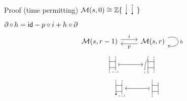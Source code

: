 
\begin{frame}[fragile]{Proof (time permitting)}
	\pause
	 $\cM(s,0) \cong \Z\{
	\raisebox{-3pt}{
		\begin{tikzpicture}[scale=.3]
			\draw (0,.5)--(0,-.75);
			\node[scale=.4] at (0,.75){1};
			\fill (0,-.65) circle (3pt);

			\node[scale=.4] at (.55,0){$\dots$};

			\draw (1,.5)--(1,-.75);
			\node[scale=.5] at (1,.75){$s$};
			\fill (1,-.65) circle (3pt);
		\end{tikzpicture}
	}\}$

	\medskip\pause

	 $\operatorname{\partial} \circ \, h = \mathsf{id} - p \circ i + h \circ \operatorname{\partial}$
	\vskip -5pt
	\[
	\begin{tikzcd}
		\cM(s,r-1) \arrow[r, "i", shift left=3pt]
		& \cM(s,r) \arrow[l, "p", shift left=3pt] \arrow[loop right, "h", distance=2em]
	\end{tikzcd}
	\]
	\pause\vskip -20pt
	\[
	\begin{tikzpicture}[scale=.3]
		\draw (0,1) -- (0,-1);
		\draw (1,1) -- (1,-1);
		\draw (0,.5) -- (1,.5);
		\draw (0,-.5) -- (1,-.5);
		\node[scale=.4] at (0,1.25){$1$};
		\node[scale=.4] at (0,-1.25){$1$};
		\node[scale=.4] at (1,1.25){$s$};
		\node[scale=.4] at (1,-1.25){$r-1$};
		\draw (1.5,0) edge[|->] (5.5,0);
	\end{tikzpicture}
	\begin{tikzpicture}[scale=.3]
		\draw (0,1) -- (0,-1);
		\draw (1,1) -- (1,-1);
		\draw (0,.5) -- (1,.5);
		\draw (0,-.5) -- (1,-.5);
		\node[scale=.4] at (0,1.25){$1$};
		\node[scale=.4] at (0,-1.25){$2$};
		\node[scale=.4] at (1,1.25){$s$};
		\node[scale=.4] at (1,-1.25){$r$};
		\draw (0,.85) edge[out=200,in=-90] (-.5,-.7);
		\node[scale=.4] at (-.5,-1.25){$1$};
	\end{tikzpicture}
	\]
	\vskip -10pt
	\[
	\begin{tikzpicture}[scale=.3]
		\node at (-7.5,0){};
		\draw (-5,1) -- (-5,-1);
		\draw (-6,1) -- (-6,-1);
		\draw (-6,.5) -- (-5,.5);
		\draw (-6,-.5) -- (-5,-.5);
		\node[scale=.4] at (-6,1.25){$1$};
		\fill (-6,-.95) circle (3pt);
		\node[scale=.4] at (-5,1.25){$s$};
		\node[scale=.4] at (-5,-1.25){$r-1$};
		\draw (-4.5,0) edge[<-|] (-.5,0);
		\draw (0,1) -- (0,-1);
		\draw (1,1) -- (1,-1);
		\draw (0,.5) -- (1,.5);
		\draw (0,-.5) -- (1,-.5);
		\node[scale=.4] at (0,1.25){$1$};
		\node[scale=.4] at (0,-1.25){$1$};

\end{tikzpicture}\]
\end{frame}
